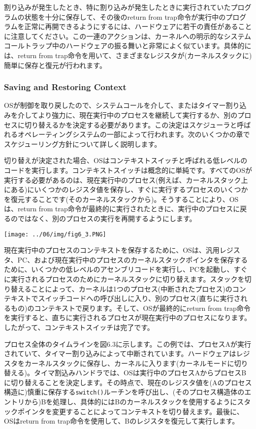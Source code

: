 割り込みが発生したとき、特に割り込みが発生したときに実行されていたプログラムの状態を十分に保存して、その後のreturn
from
trap命令が実行中のプログラムを正常に再開できるようにするには、ハードウェアに若干の責任があることに注意してください。この一連のアクションは、カーネルへの明示的なシステムコールトラップ中のハードウェアの振る舞いと非常によく似ています。具体的には、return
from
trap命令を用いて、さまざまなレジスタが(カーネルスタックに)簡単に保存と復元が行われます。

\hypertarget{saving-and-restoring-context}{%
\subsubsection*{Saving and Restoring
Context}\label{saving-and-restoring-context}}

OSが制御を取り戻したので、システムコールを介して、またはタイマー割り込みを介してより強力に、現在実行中のプロセスを継続して実行するか、別のプロセスに切り替えるかを決定する必要があります。この決定はスケジューラと呼ばれるオペレーティングシステムの一部によって行われます。次のいくつかの章でスケジューリング方針について詳しく説明します。

切り替えが決定された場合、OSはコンテキストスイッチと呼ばれる低レベルのコードを実行します。コンテキストスイッチは概念的に単純です。すべてのOSが実行する必要があるのは、現在実行中のプロセス(例えば、カーネルスタック上にある)にいくつかのレジスタ値を保存し、すぐに実行するプロセスのいくつかを復元することです(そのカーネルスタックから)。そうすることにより、OSは、return
from
trap命令が最終的に実行されたときに、実行中のプロセスに戻るのではなく、別のプロセスの実行を再開するようにします。

\texttt{[image: ../06/img/fig6\_3.PNG]}

現在実行中のプロセスのコンテキストを保存するために、OSは、汎用レジスタ、PC、および現在実行中のプロセスのカーネルスタックポインタを保存するために、いくつかの低レベルのアセンブリコードを実行し、PCを起動し、すぐに実行されるプロセスのためにカーネルスタックに切り替えます。スタックを切り替えることによって、カーネルは1つのプロセス(中断されたプロセス)のコンテキストでスイッチコードへの呼び出しに入り、別のプロセス(直ちに実行されるもの)のコンテキストで戻ります。そして、OSが最終的にreturn
from
trap命令を実行すると、直ちに実行されるプロセスが現在実行中のプロセスになります。したがって、コンテキストスイッチは完了です。

プロセス全体のタイムラインを図6.3に示します。この例では、プロセスAが実行されていて、タイマー割り込みによって中断されています。ハードウェアはレジスタをカーネルスタックに保存し、カーネルに入ります(カーネルモードに切り替える)。タイマ割込みハンドラでは、OSは実行中のプロセスAからプロセスBに切り替えることを決定します。その時点で、現在のレジスタ値を(Aのプロセス構造に)慎重に保存する\texttt{switch()}ルーチンを呼び出し、(そのプロセス構造体のエントリから)Bを処理し、具体的にはBのカーネルスタックを使用するようにスタックポインタを変更することによってコンテキストを切り替えます。最後に、OSはreturn
from trap命令を使用して、Bのレジスタを復元して実行します。

